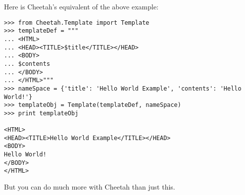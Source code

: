 Here is Cheetah's equivalent of the above example:

\begin{verbatim}
>>> from Cheetah.Template import Template
>>> templateDef = """
... <HTML>
... <HEAD><TITLE>$title</TITLE></HEAD>
... <BODY>
... $contents
... </BODY>
... </HTML>"""
>>> nameSpace = {'title': 'Hello World Example', 'contents': 'Hello World!'}
>>> templateObj = Template(templateDef, nameSpace)
>>> print templateObj
 
<HTML>
<HEAD><TITLE>Hello World Example</TITLE></HEAD>
<BODY>
Hello World!
</BODY>
</HTML>
\end{verbatim}


But you can do much more with Cheetah than just this.



